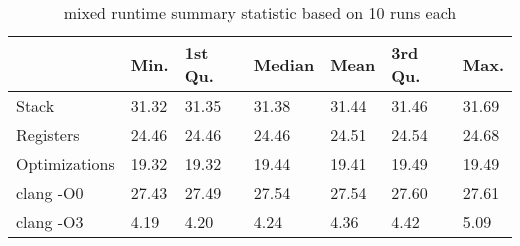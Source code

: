 \begin{table}[h!]
\centering
\begin{tabular}{p{}p{}p{}p{}p{}p{}p{}}
  \hline
 & Min. & 1st Qu. & Median & Mean & 3rd Qu. & Max. \\ 
  \hline
Stack & 31.32 & 31.35 & 31.38 & 31.44 & 31.46 & 31.69 \\ 
  Registers & 24.46 & 24.46 & 24.46 & 24.51 & 24.54 & 24.68 \\ 
  Optimizations & 19.32 & 19.32 & 19.44 & 19.41 & 19.49 & 19.49 \\ 
  clang -O0 & 27.43 & 27.49 & 27.54 & 27.54 & 27.60 & 27.61 \\ 
  clang -O3 & 4.19 & 4.20 & 4.24 & 4.36 & 4.42 & 5.09 \\ 
   \hline
\end{tabular}
\caption{mixed runtime summary statistic based on 10 runs each}
\end{table}
